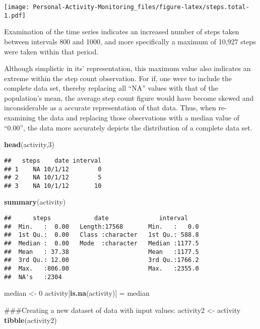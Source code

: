 \documentclass[]{article}
\newenvironment{Shaded}{\begin{snugshade}}{\end{snugshade}}
\newcommand{\KeywordTok}[1]{\textcolor[rgb]{0.13,0.29,0.53}{\textbf{#1}}}
\newcommand{\DecValTok}[1]{\textcolor[rgb]{0.00,0.00,0.81}{#1}}
\newcommand{\StringTok}[1]{\textcolor[rgb]{0.31,0.60,0.02}{#1}}
\newcommand{\NormalTok}[1]{#1}
\begin{document}
\texttt{[image: Personal-Activity-Monitoring\_files/figure-latex/steps.total-1.pdf]}

Examination of the time series indicates an increased number of steps
taken between intervals 800 and 1000, and more specifically a maximum of
10,927 steps were taken within that period.

Although simplistic in its' representation, this maximum value also
indicates an extreme within the step count observation. For if, one were
to include the complete data set, thereby replacing all ``NA'' values
with that of the population's mean, the average step count figure would
have become skewed and inconsiderable as a accurate representation of
that data. Thus, when re-examining the data and replacing those
observations with a median value of ``0.00'', the data more accurately
depicts the distribution of a complete data set.

\begin{Shaded}
\begin{Highlighting}[]
\KeywordTok{head}\NormalTok{(activity,}\DecValTok{3}\NormalTok{)}
\end{Highlighting}
\end{Shaded}

\begin{verbatim}
##   steps    date interval
## 1    NA 10/1/12        0
## 2    NA 10/1/12        5
## 3    NA 10/1/12       10
\end{verbatim}

\begin{Shaded}
\begin{Highlighting}[]
\KeywordTok{summary}\NormalTok{(activity)}
\end{Highlighting}
\end{Shaded}

\begin{verbatim}
##      steps            date              interval     
##  Min.   :  0.00   Length:17568       Min.   :   0.0  
##  1st Qu.:  0.00   Class :character   1st Qu.: 588.8  
##  Median :  0.00   Mode  :character   Median :1177.5  
##  Mean   : 37.38                      Mean   :1177.5  
##  3rd Qu.: 12.00                      3rd Qu.:1766.2  
##  Max.   :806.00                      Max.   :2355.0  
##  NA's   :2304
\end{verbatim}

\begin{Shaded}
\begin{Highlighting}[]
\NormalTok{median <-}\StringTok{ }\DecValTok{0}
\NormalTok{activity[}\KeywordTok{is.na}\NormalTok{(activity)] =}\StringTok{ }\NormalTok{median}

\NormalTok{###Creating a new dataset of data with input values:}
\NormalTok{activity2 <-}\StringTok{ }\NormalTok{activity}
\KeywordTok{tibble}\NormalTok{(activity2)}
\end{Highlighting}
\end{Shaded}
\end{document}
